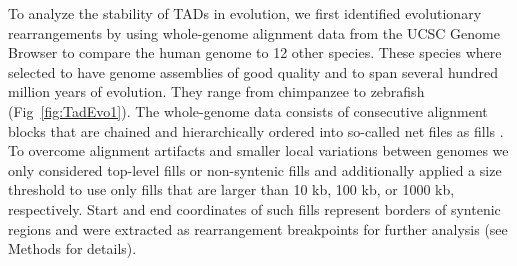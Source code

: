 \documentclass[a4paper,twoside=true,openright,parskip=full,chapterprefix=true,11pt,headings=normal,bibliography=totoc,listof=totoc,titlepage=on,captions=tableabove,draft=false]{scrreprt}
\theoremstyle{definition}
\theoremstyle{definition}
\theoremstyle{definition}
\theoremstyle{remark}
\begin{document}
To analyze the stability of TADs in evolution, we first identified
evolutionary rearrangements by using whole-genome alignment data from
the UCSC Genome Browser \citep{Kent2003, Kent2002} to compare the human
genome to 12 other species. These species where selected to have genome
assemblies of good quality and to span several hundred million years of
evolution. They range from chimpanzee to zebrafish
(Fig~\ref{fig:TadEvo1}). The whole-genome data consists of consecutive
alignment blocks that are chained and hierarchically ordered into
so-called net files as fills \citep{Kent2003}. To overcome alignment
artifacts and smaller local variations between genomes we only
considered top-level fills or non-syntenic fills and additionally
applied a size threshold to use only fills that are larger than 10 kb,
100 kb, or 1000 kb, respectively. Start and end coordinates of such
fills represent borders of syntenic regions and were extracted as
rearrangement breakpoints for further analysis (see Methods for
details).
\end{document}
